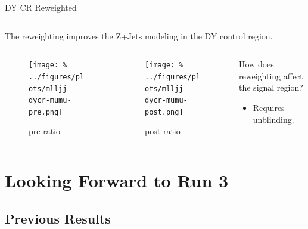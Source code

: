 \documentclass[aspectratio=169]{beamer}
\begin{document}
\begin{frame}{DY CR Reweighted}
  \begin{columns}
    \begin{column}{0.69\textwidth}
      \begin{block}{}
        \centering
        The reweighting improves the Z+Jets modeling in the DY control region.
      \end{block}
    \end{column}
    \begin{column}{0.3\textwidth}
      \centering
      \resizebox{0.9\columnwidth}{!}{%
      
      }
    \end{column}
  \end{columns}
  \begin{columns}
    \begin{column}{0.35\textwidth}
      \begin{figure}
        \texttt{[image: \%
        ../figures/plots/mlljj-dycr-mumu-pre.png]}
        \caption{pre-ratio}
      \end{figure}
    \end{column}
    \begin{column}{0.35\textwidth}
      \begin{figure}
        \texttt{[image: \%
        ../figures/plots/mlljj-dycr-mumu-post.png]}
        \caption{post-ratio}
      \end{figure}
    \end{column}
    \begin{column}{0.3\textwidth}
      \begin{block}{}
        How does reweighting affect the signal region?
          \begin{itemize}
            \footnotesize
            \item Requires unblinding.
          \end{itemize}
      \end{block}
    \end{column}
  \end{columns}
\end{frame}

\section{Looking Forward to Run 3}
\subsection{Previous Results}
\end{document}
